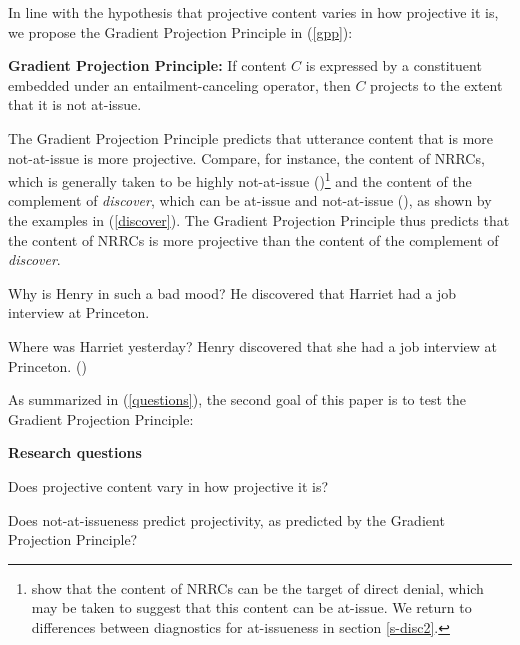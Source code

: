 \documentclass[11pt,fleqn]{article}
\newcommand{\6}{\mbox{$[\hspace*{-.6mm}[$}}
\newcommand{\9}{\mbox{$]\hspace*{-.6mm}]$}}
\begin{document}
In line with the hypothesis that projective content varies in how projective it is, we propose the Gradient Projection Principle in (\ref{gpp}):

\begin{exe}
\ex\label{gpp} {\bf Gradient Projection Principle:} If content $C$ is expressed by a constituent embedded under an entailment-canceling operator, then $C$ projects to the 
extent that it is not at-issue.

\end{exe} 
The Gradient Projection Principle predicts that utterance content that is more not-at-issue is more projective. Compare, for instance, the content of NRRCs, which is generally taken to be highly not-at-issue (\citealt{potts05})\footnote{\citet{syrett-koev2015} show that the content of NRRCs can be the target of direct denial, which may be taken to suggest that this content can be at-issue. We return to differences between diagnostics for at-issueness in section \ref{s-disc2}.} and the content of the complement of {\em discover}, which can be at-issue and not-at-issue (\citealt{simons07}), as shown by the examples in (\ref{discover}). The Gradient Projection Principle thus predicts that the content of NRRCs is more projective than the content of the complement of {\em discover}.

\begin{exe}
\ex\label{discover}
\begin{xlist}

\ex
\begin{xlist}
 Why is Henry in such a bad mood?
 He discovered that Harriet had a job interview at Princeton. 
\end{xlist}

\ex
\begin{xlist}
 Where was Harriet yesterday?
 Henry discovered that she had a job interview at Princeton. \hfill (\citealt[1035]{simons07})
\end{xlist}
\end{xlist}
\end{exe}
As summarized in (\ref{questions}), the second goal of this paper is to test the Gradient Projection Principle:

\begin{exe}
\ex\label{questions} {\bf Research questions}

\begin{xlist} 

\ex Does projective content vary in how projective it is?

\ex Does not-at-issueness predict projectivity, as predicted by the Gradient Projection Principle?
\end{xlist}

\end{exe} 
\end{document}
